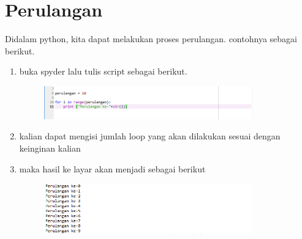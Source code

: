 \section*{Perulangan}

\par
Didalam python, kita dapat melakukan proses perulangan. contohnya sebagai berikut.


\begin{enumerate}
	\item buka spyder lalu tulis script sebagai berikut.
	\begin{figure} [h]
	\includegraphics[width=9cm]{loop/loop1.png}
	\centering
	\end{figure}

\item kalian dapat mengisi jumlah loop yang akan dilakukan sesuai dengan keinginan kalian
	
    \item maka hasil ke layar akan menjadi sebagai berikut
	\begin{figure} [h]
	\includegraphics[width=9cm]{loop/loop2.png}
	\centering
	\end{figure}
	
	

\end{enumerate}